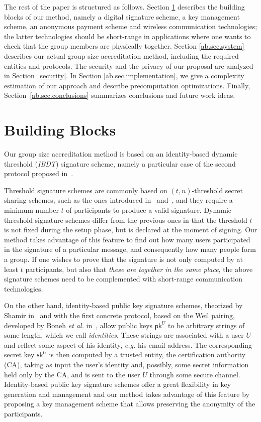\documentclass[11pt]{llncs}
\def\pk{\mathsf{pk}}
\def\sk{\mathsf{sk}}
\begin{document}
The rest of the paper is structured as follows.
Section \ref{ab.sec.buildingblocks} describes the building
blocks of our method, namely a digital
signature scheme, a key management scheme, an anonymous
payment scheme and wireless communication technologies;
the latter technologies should be short-range in applications
where one wants to check that the group members
are physically together.
Section \ref{ab.sec.system} describes our actual
group size accreditation method, including the required entities and protocols.
The security and the privacy
of our proposal are analyzed in Section~\ref{security}.
In Section \ref{ab.sec.implementation}, we give
a complexity estimation of our approach and describe
precomputation optimizations.
Finally, Section~\ref{ab.sec.conclusions} summarizes conclusions
and future work ideas.




\section{Building Blocks}\label{ab.sec.buildingblocks}

Our group size accreditation method is based on an identity-based
dynamic threshold (\emph{IBDT}) signature scheme, namely a
particular case of the second protocol proposed in~\cite{ab.Herranz2012}.

Threshold signature schemes are commonly based on
$(t,n)$-threshold secret sharing schemes, such as
the ones introduced in~\cite{ab.Blakley1979} and~\cite{ab.Shamir1979},
and they require a minimum number $t$ of participants
to produce a valid signature.
Dynamic threshold signature schemes differ from
the previous ones in that the threshold $t$ is not fixed during
the setup phase, but is declared at the moment of signing.
Our method takes advantage of this feature to find out
how many users participated in the signature of
a particular message, and consequently how many
people form a group.
If one wishes to prove that the signature is not only computed
by at least $t$ participants, but also that {\em these are
together in the same place}, the above signature schemes
need to be complemented
with short-range communication technologies.

On the other hand, identity-based public key signature schemes,
theorized by Shamir in~\cite{ab.Shamir1985} and with the
first concrete protocol, based on the Weil pairing,
developed by Boneh \emph{et al.} in~\cite{ab.Boneh2001},
allow public keys $\pk^U$
to be arbitrary strings of some length, which we call \emph{identities}.
These strings are associated with a user $U$ and reflect some
aspect of his identity, \emph{e.g.} his email address.
The corresponding secret key $\sk^U$ is then computed by a trusted entity,
the certification authority (CA), taking as input the user's identity and,
possibly, some secret information held only by the CA, and is
sent to the user $U$ through some secure channel.
Identity-based public key signature schemes offer a great flexibility
in key generation and management and our method takes advantage
of this feature by proposing a key management scheme that allows
preserving the anonymity of the participants.
\end{document}
